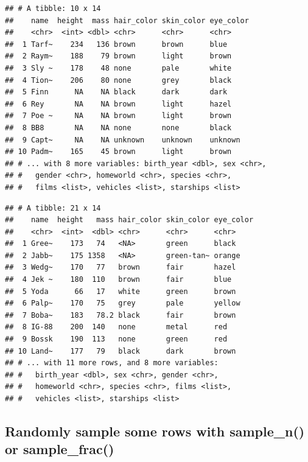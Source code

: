 \documentclass[
]{book}
\newenvironment{Shaded}{\begin{snugshade}}{\end{snugshade}}
\newcommand{\DecValTok}[1]{\textcolor[rgb]{0.00,0.00,0.81}{#1}}
\newcommand{\KeywordTok}[1]{\textcolor[rgb]{0.13,0.29,0.53}{\textbf{#1}}}
\newcommand{\NormalTok}[1]{#1}
\newcommand{\OperatorTok}[1]{\textcolor[rgb]{0.81,0.36,0.00}{\textbf{#1}}}
\newcommand{\StringTok}[1]{\textcolor[rgb]{0.31,0.60,0.02}{#1}}
\begin{document}
\begin{verbatim}
## # A tibble: 10 x 14
##    name  height  mass hair_color skin_color eye_color
##    <chr>  <int> <dbl> <chr>      <chr>      <chr>    
##  1 Tarf~    234   136 brown      brown      blue     
##  2 Raym~    188    79 brown      light      brown    
##  3 Sly ~    178    48 none       pale       white    
##  4 Tion~    206    80 none       grey       black    
##  5 Finn      NA    NA black      dark       dark     
##  6 Rey       NA    NA brown      light      hazel    
##  7 Poe ~     NA    NA brown      light      brown    
##  8 BB8       NA    NA none       none       black    
##  9 Capt~     NA    NA unknown    unknown    unknown  
## 10 Padm~    165    45 brown      light      brown    
## # ... with 8 more variables: birth_year <dbl>, sex <chr>,
## #   gender <chr>, homeworld <chr>, species <chr>,
## #   films <list>, vehicles <list>, starships <list>
\end{verbatim}

\begin{Shaded}
\end{Shaded}

\begin{verbatim}
## # A tibble: 21 x 14
##    name  height   mass hair_color skin_color eye_color
##    <chr>  <int>  <dbl> <chr>      <chr>      <chr>    
##  1 Gree~    173   74   <NA>       green      black    
##  2 Jabb~    175 1358   <NA>       green-tan~ orange   
##  3 Wedg~    170   77   brown      fair       hazel    
##  4 Jek ~    180  110   brown      fair       blue     
##  5 Yoda      66   17   white      green      brown    
##  6 Palp~    170   75   grey       pale       yellow   
##  7 Boba~    183   78.2 black      fair       brown    
##  8 IG-88    200  140   none       metal      red      
##  9 Bossk    190  113   none       green      red      
## 10 Land~    177   79   black      dark       brown    
## # ... with 11 more rows, and 8 more variables:
## #   birth_year <dbl>, sex <chr>, gender <chr>,
## #   homeworld <chr>, species <chr>, films <list>,
## #   vehicles <list>, starships <list>
\end{verbatim}

\hypertarget{randomly-sample-some-rows-with-sample_n-or-sample_frac}{%
\subsection{Randomly sample some rows with sample\_n() or sample\_frac()}\label{randomly-sample-some-rows-with-sample_n-or-sample_frac}}
\end{document}
